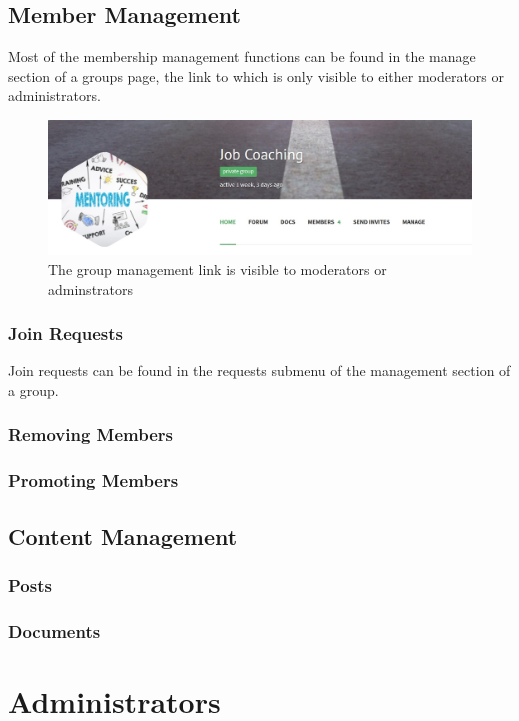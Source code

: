 \documentclass[10pt]{article}
\begin{document}
\subsection{Member Management}
\begin{flushleft}
Most of the membership management functions can be found in the manage section of a groups page, the link to which is only visible to either moderators or administrators.
\end{flushleft}

\begin{figure}[h]
    \centering
    \includegraphics{images/groupmanage.jpg}
    \caption{The group management link is visible to moderators or adminstrators}
    \label{groupmanagelink}
\end{figure}

\subsubsection{Join Requests}

\begin{flushleft}
Join requests can be found in the requests submenu of the management section of a group. 
\end{flushleft}

\subsubsection{Removing Members}
\subsubsection{Promoting Members}
\subsection{Content Management}
\subsubsection{Posts}
\subsubsection{Documents}





\section{Administrators}


\end{document}
